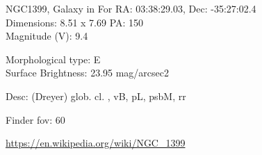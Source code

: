 \begin{block}{NGC1399, Galaxy in For}
    RA: 03:38:29.03, Dec: -35:27:02.4 \\ 
    Dimensions: 8.51 x 7.69 PA: 150 \\ 
    Magnitude (V): 9.4

    Morphological type: E \\ 
    Surface Brightness: 23.95 mag/arcsec2 

    Desc: (Dreyer) glob. cl. , vB, pL, psbM, rr 

    Finder fov: 60 

    \url{https://en.wikipedia.org/wiki/NGC_1399} 
\end{block}